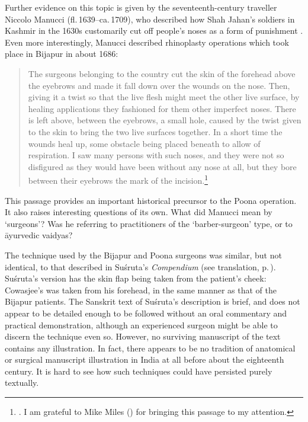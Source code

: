 Further evidence on this topic is given by the
seventeenth-century traveller Niccolo Manucci
(fl.\,1639--ca.\,1709), who described how Shah Jahan's soldiers
in Kashmir in the 1630s customarily cut off people's noses as a
form of punishment \citep[i.215--6]{manu-stor}.  Even more
interestingly, Manucci described rhinoplasty operations which
took place in Bijapur in about 1686:
\begin{quote}
    The surgeons belonging to the country cut the skin of the
    forehead above the eyebrows and made it fall down over the wounds
    on the nose. Then, giving it a twist so that the live flesh might
    meet the other live surface, by healing applications they
    fashioned for them other imperfect noses. There is left above,
    between the eyebrows, a small hole, caused by the twist given to
    the skin to bring the two live surfaces together. In a short time
    the wounds heal up, some obstacle being placed beneath to allow
    of respiration. I saw many persons with such noses, and they were
    not so disfigured as they would have been without any nose at
    all, but they bore between their eyebrows the mark of the
    incision.\footnote{\citet[ii.301]{manu-stor}.  I am grateful to
    Mike Miles (\citeyear{mile-march1999}) for bringing this passage
    to my attention.}
\end{quote}
This passage provides an important historical precursor to the
Poona operation.  It also raises interesting questions of its own.
What did Manucci mean by `surgeons'?  Was he referring to
practitioners of the `barber-surgeon' type, or to āyurvedic
vaidyas?


\begin{sloppypar}
    The technique used by the Bijapur and Poona surgeons was similar,
    but not identical, to that described in Suśruta's
    \emph{Compendium} (see translation,
    p.\,\pageref{su:rhinoplasty}).  Suśruta's version has the skin
    flap being taken from the patient's cheek: Cowasjee's was taken
    from his forehead, in the same manner as that of the Bijapur
    patients.  The Sanskrit text of Suśruta's description is brief,
    and does not appear to be detailed enough to be followed without
    an oral commentary and practical demonstration, although an
    experienced surgeon might be able to discern the technique even
    so.  However, no surviving manuscript of the text contains any
    illustration. In fact, there appears to be no tradition of
    anatomical or surgical manuscript illustration in India at all
    before about the eighteenth century. It is hard to see how such
    techniques could have persisted purely textually.
\end{sloppypar}


